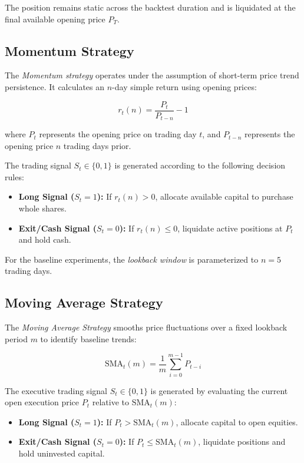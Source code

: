 \documentclass{article}
\begin{document}
The position remains static across the backtest duration and is liquidated at the final available opening price $P_T$.

\subsection{Momentum Strategy}
The \textit{Momentum strategy} operates under the assumption of short-term price trend persistence. It calculates an $n$-day simple return using opening prices:

\[
r_t(n) = \frac{P_t}{P_{t-n}} - 1
\]

where $P_t$ represents the opening price on trading day $t$, and $P_{t-n}$ represents the opening price $n$ trading days prior.

The trading signal $S_t \in \{0, 1\}$ is generated according to the following decision rules:
\begin{itemize}
\item \textbf{Long Signal ($S_t = 1$):} If $r_t(n) > 0$, allocate available capital to purchase whole shares.
\item \textbf{Exit/Cash Signal ($S_t = 0$):} If $r_t(n) \le 0$, liquidate active positions at $P_t$ and hold cash.
\end{itemize}

For the baseline experiments, the \textit{lookback window} is parameterized to $n = 5$ trading days.

\subsection{Moving Average Strategy}
The \textit{Moving Average Strategy} smooths price fluctuations over a fixed lookback period $m$ to identify baseline trends:

\[
\text{SMA}_t(m) = \frac{1}{m} \sum_{i=0}^{m-1} P_{t-i}
\]

The executive trading signal $S_t \in \{0, 1\}$ is generated by evaluating the current open execution price $P_t$ relative to $\text{SMA}_t(m)$:

\begin{itemize}
\item \textbf{Long Signal ($S_t = 1$):} If $P_t > \text{SMA}_t(m)$, allocate capital to open equities.
\item \textbf{Exit/Cash Signal ($S_t = 0$):} If $P_t \le \text{SMA}_t(m)$, liquidate positions and hold uninvested capital.
\end{itemize}
\end{document}

